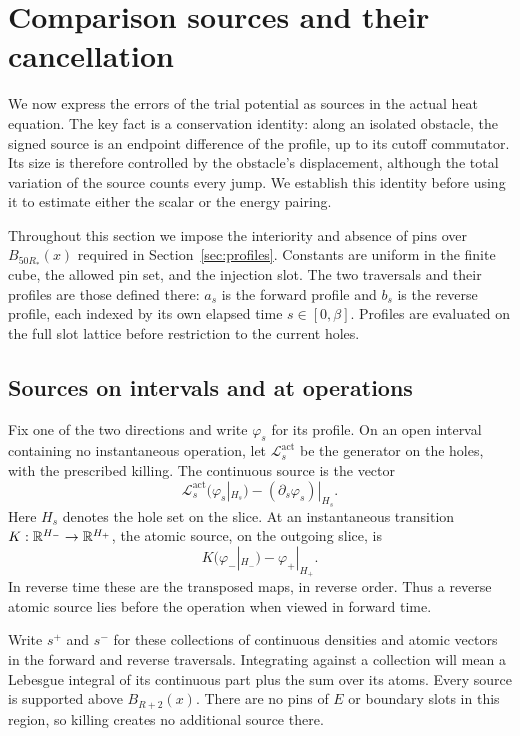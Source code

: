 \section{Comparison sources and their cancellation}\label{sec:sources}

We now express the errors of the trial potential as sources in the
actual heat equation.  The key fact is a conservation identity: along
an isolated obstacle, the signed source is an endpoint difference of
the profile, up to its cutoff commutator.  Its size is therefore controlled by the obstacle's
displacement, although the total variation of the source counts every
jump.  We establish this identity before using it to estimate either
the scalar or the energy pairing.

Throughout this section we impose the interiority and absence of pins
over $B_{50R_*}(x)$ required in Section~\ref{sec:profiles}.  Constants
are uniform in the finite cube, the allowed pin set, and the injection
slot.  The two traversals and their profiles are those defined there:
$a_s$ is the forward profile and $b_s$ is the reverse profile, each
indexed by its own elapsed time $s\in[0,\beta]$.  Profiles are evaluated
on the full slot lattice before restriction to the current holes.

\subsection{Sources on intervals and at operations}

Fix one of the two directions and write $\varphi_s$ for its profile.
On an open interval containing no instantaneous operation, let
$\mathscr L_s^{\mathrm{act}}$ be the generator on the holes, with the
prescribed killing.  The continuous source is the vector
\begin{equation}\label{eq:continuous-source}
 \mathscr L_s^{\mathrm{act}}(\varphi_s|_{H_s})
             -(\partial_s\varphi_s)|_{H_s}.
\end{equation}
Here $H_s$ denotes the hole set on the slice.  At an instantaneous
transition $K:\mathbb R^{H_-}\to\mathbb R^{H_+}$, the atomic source, on the outgoing slice, is
\begin{equation}\label{eq:atomic-source}
 K(\varphi_-|_{H_-})-\varphi_+|_{H_+}.
\end{equation}
In reverse time these are the transposed maps, in reverse order.
Thus a reverse atomic source lies before the
operation when viewed in forward time.

Write $s^+$ and $s^-$ for these collections of continuous densities
and atomic vectors in the forward and reverse traversals.  Integrating
against a collection will mean a Lebesgue integral of its continuous
part plus the sum over its atoms.  Every source is supported above
$B_{R+2}(x)$.  There are no pins of $E$ or boundary slots in this region,
so killing creates no additional source there.

